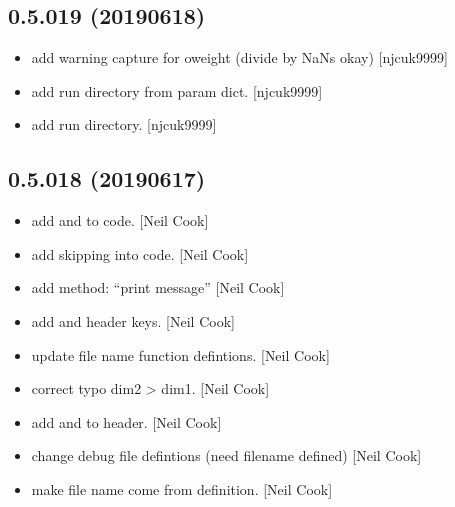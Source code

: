 \documentclass[a4paper,10pt,english]{report}
\begin{document}
\subsection{0.5.019 (2019\sphinxhyphen{}06\sphinxhyphen{}18)}
\label{\detokenize{misc/changelog:id137}}\begin{itemize}
\item {} 
 \sphinxhyphen{} add warning capture for oweight (divide by NaNs okay)
{[}njcuk9999{]}

\item {} 
 \sphinxhyphen{} add run directory from param dict. {[}njcuk9999{]}

\item {} 
 \sphinxhyphen{} add run directory. {[}njcuk9999{]}

\end{itemize}


\subsection{0.5.018 (2019\sphinxhyphen{}06\sphinxhyphen{}17)}
\label{\detokenize{misc/changelog:id138}}\begin{itemize}
\item {} 
 \sphinxhyphen{} add  and  to code. {[}Neil Cook{]}

\item {} 
 \sphinxhyphen{} add skipping into code. {[}Neil Cook{]}

\item {} 
 \sphinxhyphen{} add method: “print message” {[}Neil Cook{]}

\item {} 
 \sphinxhyphen{} add  and  header keys. {[}Neil Cook{]}

\item {} 
 \sphinxhyphen{} update file name function defintions. {[}Neil Cook{]}

\item {} 
 \sphinxhyphen{} correct typo dim2 \textendash{}\textgreater{} dim1. {[}Neil Cook{]}

\item {} 
 \sphinxhyphen{} add  and  to header. {[}Neil Cook{]}

\item {} 
 \sphinxhyphen{} change debug file defintions (need filename
defined) {[}Neil Cook{]}

\item {} 
 \sphinxhyphen{} make file name come from definition. {[}Neil
Cook{]}

\end{itemize}
\end{document}
